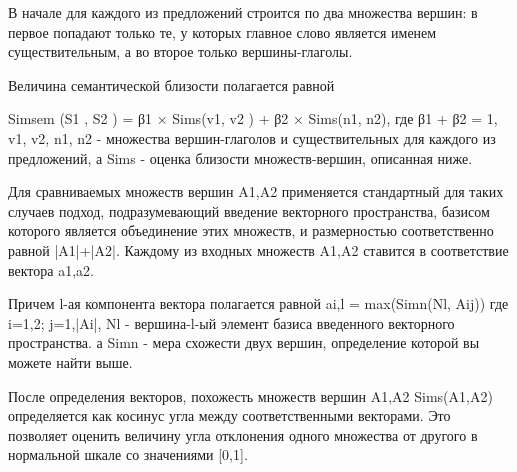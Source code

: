В начале для каждого из предложений строится по два множества вершин:
в первое попадают только те, у которых главное слово является именем существительным,
а во второе только вершины-глаголы.

Величина семантической близости полагается равной

Simsem (S1 , S2 ) = β1 × Sims(v1, v2 ) + β2 × Sims(n1, n2), где 
β1 + β2 = 1, 
v1, v2, n1, n2 - множества вершин-глаголов и существительных для каждого из предложений,
а Sims - оценка близости множеств-вершин, описанная ниже.

Для сравниваемых множеств вершин A1,A2 применяется стандартный для таких случаев подход,
подразумевающий введение векторного пространства, базисом которого является объединение этих множеств,
и размерностью соответственно равной |A1|+|A2|.  
Каждому из входных множеств A1,A2 ставится в соответствие вектора a1,a2.

Причем l-ая компонента вектора полагается равной 
ai,l = max(Simn(Nl, Aij)) 
где i=1,2; j=1,|Ai|,
Nl - вершина-l-ый элемент базиса введенного векторного пространства.
а Simn - мера схожести двух вершин, определение которой вы можете найти выше.

После определения векторов, похожесть множеств вершин A1,A2 Sims(A1,A2) определяется
как косинус угла между соответственными векторами. 
Это позволяет оценить величину угла отклонения одного множества от другого в нормальной шкале
со значениями [0,1]. 







